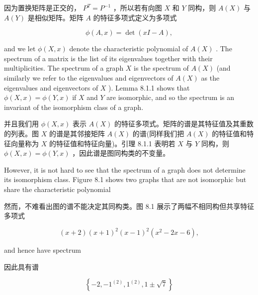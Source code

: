 \documentclass[10pt]{article}
\begin{document}
\begin{tcolorbox}\relax
因为置换矩阵是正交的， \({P}^{T} = {P}^{-1}\) ，所以若有向图 \(X\) 和 \(Y\) 同构，则 \(A\left( X\right)\) 与 \(A\left( Y\right)\) 是相似矩阵。矩阵 \(A\) 的特征多项式定义为多项式
\end{tcolorbox}

\[
\phi \left( {A,x}\right)  = \det \left( {{xI} - A}\right) ,
\]

and we let \(\phi \left( {X,x}\right)\) denote the characteristic polynomial of \(A\left( X\right)\) . The spectrum of a matrix is the list of its eigenvalues together with their multiplicities. The spectrum of a graph \(X\) is the spectrum of \(A\left( X\right)\) (and similarly we refer to the eigenvalues and eigenvectors of \(A\left( X\right)\) as the eigenvalues and eigenvectors of \(X\) ). Lemma 8.1.1 shows that \(\phi \left( {X,x}\right)  = \phi \left( {Y,x}\right)\) if \(X\) and \(Y\) are isomorphic, and so the spectrum is an invariant of the isomorphism class of a graph.

\begin{tcolorbox}\relax
并且我们用 \(\phi \left( {X,x}\right)\) 表示 \(A\left( X\right)\) 的特征多项式。矩阵的谱是其特征值及其重数的列表。图 \(X\) 的谱是其邻接矩阵 \(A\left( X\right)\) 的谱(同样我们把 \(A\left( X\right)\) 的特征值和特征向量称为 \(X\) 的特征值和特征向量)。引理 8.1.1 表明若 \(X\) 与 \(Y\) 同构，则 \(\phi \left( {X,x}\right)  = \phi \left( {Y,x}\right)\) ，因此谱是图同构类的不变量。
\end{tcolorbox}

However, it is not hard to see that the spectrum of a graph does not determine its isomorphism class. Figure 8.1 shows two graphs that are not isomorphic but share the characteristic polynomial

\begin{tcolorbox}\relax
然而，不难看出图的谱不能决定其同构类。图 8.1 展示了两幅不相同构但共享特征多项式
\end{tcolorbox}

\[
\left( {x + 2}\right) {\left( x + 1\right) }^{2}{\left( x - 1\right) }^{2}\left( {{x}^{2} - {2x} - 6}\right) ,
\]

and hence have spectrum

\begin{tcolorbox}\relax
因此具有谱
\end{tcolorbox}

\[
\left\{  {-2, - {1}^{\left( 2\right) },{1}^{\left( 2\right) },1 \pm  \sqrt{7}}\right\}
\]
\end{document}

